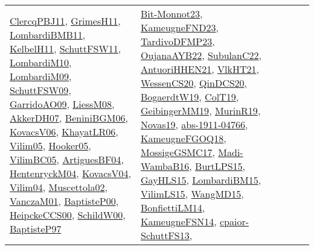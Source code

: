 {\begin{longtable}{llp{6cm}p{6cm}p{6cm}}
\href{papers/ClercqPBJ11.pdf}{ClercqPBJ11}\cite{ClercqPBJ11}, \href{papers/GrimesH11.pdf}{GrimesH11}\cite{GrimesH11}, \href{papers/LombardiBMB11.pdf}{LombardiBMB11}\cite{LombardiBMB11}, \href{articles/KelbelH11.pdf}{KelbelH11}\cite{KelbelH11}, \href{articles/SchuttFSW11.pdf}{SchuttFSW11}\cite{SchuttFSW11}, \href{papers/LombardiM10.pdf}{LombardiM10}\cite{LombardiM10}, \href{papers/LombardiM09.pdf}{LombardiM09}\cite{LombardiM09}, \href{papers/SchuttFSW09.pdf}{SchuttFSW09}\cite{SchuttFSW09}, \href{articles/GarridoAO09.pdf}{GarridoAO09}\cite{GarridoAO09}, \href{articles/LiessM08.pdf}{LiessM08}\cite{LiessM08}, \href{papers/AkkerDH07.pdf}{AkkerDH07}\cite{AkkerDH07}, \href{papers/BeniniBGM06.pdf}{BeniniBGM06}\cite{BeniniBGM06}, \href{papers/KovacsV06.pdf}{KovacsV06}\cite{KovacsV06}, \href{articles/KhayatLR06.pdf}{KhayatLR06}\cite{KhayatLR06}, \href{papers/Vilim05.pdf}{Vilim05}\cite{Vilim05}, \href{articles/Hooker05.pdf}{Hooker05}\cite{Hooker05}, \href{articles/VilimBC05.pdf}{VilimBC05}\cite{VilimBC05}, \href{papers/ArtiguesBF04.pdf}{ArtiguesBF04}\cite{ArtiguesBF04}, \href{papers/HentenryckM04.pdf}{HentenryckM04}\cite{HentenryckM04}, \href{papers/KovacsV04.pdf}{KovacsV04}\cite{KovacsV04}, \href{papers/Vilim04.pdf}{Vilim04}\cite{Vilim04}, \href{papers/Muscettola02.pdf}{Muscettola02}\cite{Muscettola02}, \href{papers/VanczaM01.pdf}{VanczaM01}\cite{VanczaM01}, \href{articles/BaptisteP00.pdf}{BaptisteP00}\cite{BaptisteP00}, \href{articles/HeipckeCCS00.pdf}{HeipckeCCS00}\cite{HeipckeCCS00}, \href{articles/SchildW00.pdf}{SchildW00}\cite{SchildW00}, \href{papers/BaptisteP97.pdf}{BaptisteP97}\cite{BaptisteP97} & \href{papers/Bit-Monnot23.pdf}{Bit-Monnot23}\cite{Bit-Monnot23}, \href{papers/KameugneFND23.pdf}{KameugneFND23}\cite{KameugneFND23}, \href{papers/TardivoDFMP23.pdf}{TardivoDFMP23}\cite{TardivoDFMP23}, \href{papers/OujanaAYB22.pdf}{OujanaAYB22}\cite{OujanaAYB22}, \href{articles/SubulanC22.pdf}{SubulanC22}\cite{SubulanC22}, \href{papers/AntuoriHHEN21.pdf}{AntuoriHHEN21}\cite{AntuoriHHEN21}, \href{articles/VlkHT21.pdf}{VlkHT21}\cite{VlkHT21}, \href{papers/WessenCS20.pdf}{WessenCS20}\cite{WessenCS20}, \href{articles/QinDCS20.pdf}{QinDCS20}\cite{QinDCS20}, \href{papers/BogaerdtW19.pdf}{BogaerdtW19}\cite{BogaerdtW19}, \href{papers/ColT19.pdf}{ColT19}\cite{ColT19}, \href{papers/GeibingerMM19.pdf}{GeibingerMM19}\cite{GeibingerMM19}, \href{papers/MurinR19.pdf}{MurinR19}\cite{MurinR19}, \href{articles/Novas19.pdf}{Novas19}\cite{Novas19}, \href{articles/abs-1911-04766.pdf}{abs-1911-04766}\cite{abs-1911-04766}, \href{papers/KameugneFGOQ18.pdf}{KameugneFGOQ18}\cite{KameugneFGOQ18}, \href{papers/MossigeGSMC17.pdf}{MossigeGSMC17}\cite{MossigeGSMC17}, \href{papers/Madi-WambaB16.pdf}{Madi-WambaB16}\cite{Madi-WambaB16}, \href{papers/BurtLPS15.pdf}{BurtLPS15}\cite{BurtLPS15}, \href{papers/GayHLS15.pdf}{GayHLS15}\cite{GayHLS15}, \href{papers/LombardiBM15.pdf}{LombardiBM15}\cite{LombardiBM15}, \href{papers/VilimLS15.pdf}{VilimLS15}\cite{VilimLS15}, \href{articles/WangMD15.pdf}{WangMD15}\cite{WangMD15}, \href{papers/BonfiettiLM14.pdf}{BonfiettiLM14}\cite{BonfiettiLM14}, \href{articles/KameugneFSN14.pdf}{KameugneFSN14}\cite{KameugneFSN14}, \href{papers/cpaior-SchuttFS13.pdf}{cpaior-SchuttFS13}\cite{cpaior-SchuttFS13}, 
\end{longtable}}
